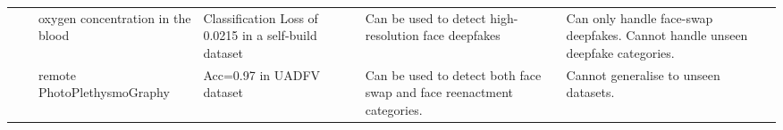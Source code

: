 \begin{table*}[htbp]
{\begin{tabular}{|p{2cm}|p{1cm}|p{5cm}|p{3cm}|p{5cm}|p{5cm}|}
                                   & \cite{fernandes2019predicting}      & oxygen concentration in the blood                                                                                      & Classification Loss of 0.0215 in a self-build dataset                       & Can be used to detect high-resolution face deepfakes                                                                                                                                                                                        & Can only handle face-swap deepfakes. Cannot handle unseen deepfake categories.                        \\ \cline{2-6} 
                                   & \cite{ciftci2020fakecatcher}        & remote PhotoPlethysmoGraphy                                                                                            & Acc=0.97 in UADFV \cite{xie2020deepfake} dataset                          & Can be used to detect both face swap and face reenactment categories.                                                                                                                                                                       & Cannot generalise to unseen datasets.                                                                 \\ \hline


\end{tabular}}
\end{table*}
